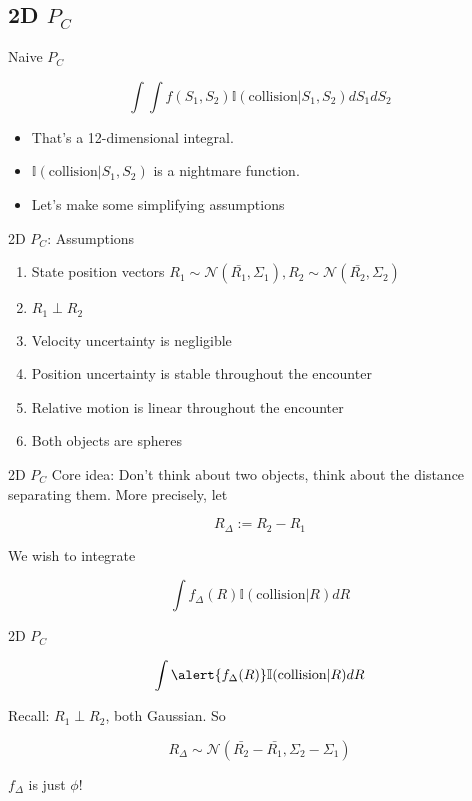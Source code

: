 \documentclass[pdf]{beamer}
\begin{document}
\subsection{2D $P_C$}
\begin{frame}{Naive $P_C$}

  \[ \int\int f(S_1,S_2) \mathbb{I}(\text{collision} | S_1,S_2) dS_1 dS_2 \]

  \begin{itemize}
  \item That's a 12-dimensional integral.
  \item $\mathbb{I}(\text{collision} | S_1,S_2)$ is a nightmare function.
  \item Let's make some simplifying assumptions
  \end{itemize}
\end{frame}

\begin{frame}{2D $P_C$: Assumptions}
  \begin{enumerate}
  \item State position vectors $R_1 \sim \mathcal{N}(\bar{R_1}, \Sigma_1), R_2 \sim \mathcal{N}(\bar{R_2}, \Sigma_2)$
  \item $R_1 \perp R_2$
  \item Velocity uncertainty is negligible
  \item Position uncertainty is stable throughout the encounter
  \item Relative motion is linear throughout the encounter
  \item Both objects are spheres
  \end{enumerate}
\end{frame}

\begin{frame}{2D $P_C$}
  Core idea: Don't think about two objects, think about
  the distance separating them. More precisely, let
  
  \[ R_\Delta := R_2 - R_1 \]

  We wish to integrate

  \[ \int f_\Delta(R) \mathbb{I}(\text{collision} | R) dR \]
\end{frame}

\begin{frame}{2D $P_C$}

  \[ \int \alert{f_\Delta(R)} \mathbb{I}(\text{collision} | R) dR \]

  Recall: $R_1 \perp R_2$, both Gaussian. So

  \[ R_\Delta \sim \mathcal{N}(\bar{R_2} - \bar{R_1}, \Sigma_2 - \Sigma_1) \]

  $f_\Delta$ is just $\phi$!
\end{frame}
\end{document}
